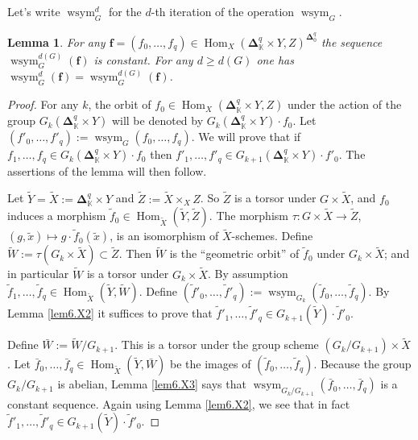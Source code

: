 \documentclass[10pt]{amsart}
\newtheorem{lem}[equation]{Lemma}
\theoremstyle{definition}
\numberwithin{equation}{section}
\newcommand{\opn}{\operatorname}
\newcommand{\mbb}[1]{\mathbb{#1}}
\newcommand{\bsym}[1]{\boldsymbol{#1}}
\newcommand{\til}[1]{\tilde{#1}}
\newcommand{\K}{\mbb{K}}
\begin{document}
Let's write $\opn{wsym}_{G}^d$ for the $d$-th iteration of the 
operation $\opn{wsym}_{G}$.

\begin{lem} \label{lem6.X4}
For any
$\bsym{f} = (f_0, \ldots, f_q) 
\in \opn{Hom}_X(\bsym{\Delta}^q_{\K} \times Y, Z)
^{\bsym{\Delta}^q_{0}}$
the sequence $\opn{wsym}_{G}^{d(G)}(\bsym{f})$ is constant.
For any $d \geq d(G)$ one has
$\opn{wsym}_{G}^{d}(\bsym{f}) = \opn{wsym}_{G}^{d(G)}(\bsym{f})$.
\end{lem}

\begin{proof}
For any $k$, the orbit of 
$f_0 \in \opn{Hom}_X(\bsym{\Delta}^q_{\K} \times Y, Z)$ 
under the action of the group
$G_k(\bsym{\Delta}^q_{\K} \times Y)$ will be denoted by
$G_k(\bsym{\Delta}^q_{\K} \times Y) \cdot f_0$.
Let 
$(f'_0, \ldots, f'_q) := \opn{wsym}_{G}(f_0, \ldots, f_q)$.
We will prove that if
$f_1, \ldots, f_q \in G_k(\bsym{\Delta}^q_{\K} \times Y) \cdot 
f_0$
then 
$f'_1, \ldots, f'_q
\in G_{k+1}(\bsym{\Delta}^q_{\K} \times Y) \cdot f'_0$.
The assertions of the lemma will then follow. 

Let $\til{Y} = \til{X} :=  \bsym{\Delta}^q_{\K} \times Y$ and
$\til{Z} := \til{X} \times_X Z$. 
So $\til{Z}$ is a torsor under $G \times \til{X}$, and $f_0$
induces a morphism 
$\til{f}_0 \in \opn{Hom}_{\til{X}}(\til{Y}, \til{Z})$.
The morphism
$\tau : G \times \til{X} \to \til{Z}$, 
$(g, \til{x}) \mapsto g \cdot \til{f}_0(\til{x})$,
is an isomorphism of $\til{X}$-schemes. Define 
$\til{W} := \tau(G_k \times \til{X}) \subset \til{Z}$. 
Then $\til{W}$ 
is the ``geometric orbit'' of $\til{f}_0$ under 
$G_k \times \til{X}$; and in particular $\til{W}$ is a torsor under 
$G_k \times \til{X}$. By assumption 
$\til{f}_1, \ldots, \til{f}_q \in 
\opn{Hom}_{\til{X}}(\til{Y}, \til{W})$. 
Define
$(\til{f}'_0, \ldots, \til{f}'_q) :=
\opn{wsym}_{G_k}(\til{f}_0, \ldots, \til{f}_q)$.
By Lemma \ref{lem6.X2} it suffices to prove that 
$\til{f}'_1, \ldots, \til{f}'_q \in
G_{k+1}(\til{Y}) \cdot \til{f}'_0$.

Define $\bar{W} := \til{W} / G_{k+1}$. 
This is a torsor under the group scheme
$(G_k / G_{k+1}) \times \til{X}$. Let
$\bar{f}_0, \ldots, \bar{f}_q \in 
\opn{Hom}_{\til{X}}(\til{Y}, \bar{W})$
be the images of $(\til{f}_0, \ldots, \til{f}_q)$.
Because the group $G_k / G_{k+1}$ is abelian, Lemma \ref{lem6.X3} 
says that 
$\opn{wsym}_{G_k / G_{k+1}}(\bar{f}_0, \ldots, \bar{f}_q)$
is a constant sequence. 
Again using Lemma \ref{lem6.X2}, we see that in fact
$\til{f}'_1, \ldots, \til{f}'_q \in
G_{k+1}(\til{Y}) \cdot \til{f}'_0$.
\end{proof}
\end{document}
